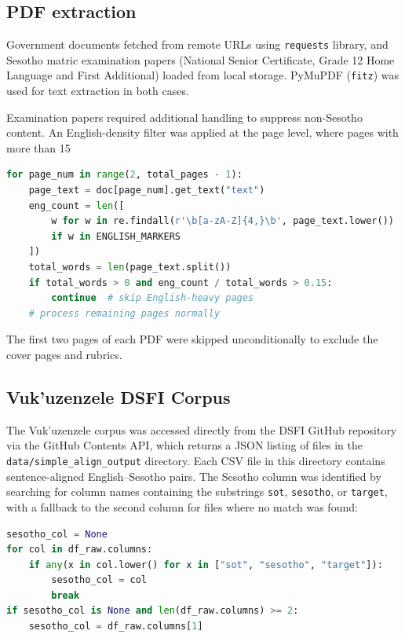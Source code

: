\documentclass[12pt]{ThesisRU}
\begin{document}
\subsection{PDF extraction}

Government documents fetched from remote URLs using \texttt{requests} library, and Sesotho matric examination papers (National Senior Certificate, Grade 12 Home Language and First Additional) loaded from local storage. PyMuPDF (\texttt{fitz}) was used for text extraction in both cases. 

Examination papers required additional handling to suppress non-Sesotho content. An English-density filter was applied at the page level, where pages with more than 15%

\begin{lstlisting}[language=Python, caption={English-density page filter for exam PDF extraction.}, label={lst:pdf}]
for page_num in range(2, total_pages - 1):
    page_text = doc[page_num].get_text("text")
    eng_count = len([
        w for w in re.findall(r'\b[a-zA-Z]{4,}\b', page_text.lower())
        if w in ENGLISH_MARKERS
    ])
    total_words = len(page_text.split())
    if total_words > 0 and eng_count / total_words > 0.15:
        continue  # skip English-heavy pages
    # process remaining pages normally
\end{lstlisting}

The first two pages of each PDF were skipped unconditionally to exclude the cover pages and rubrics.

\subsection{Vuk'uzenzele DSFI Corpus}

The Vuk'uzenzele corpus was accessed directly from the DSFI GitHub repository via the GitHub Contents API, which returns a JSON listing of files in the \texttt{data/simple\_align\_output} directory. Each CSV file in this directory contains sentence-aligned English--Sesotho pairs. The Sesotho column was identified by searching for column names containing the substrings \texttt{sot}, \texttt{sesotho}, or \texttt{target}, with a fallback to the second column for files where no match was found:

\begin{lstlisting}[language=Python, caption={Vuk'uzenzele Sesotho column extraction.}, label={lst:vuku}]
sesotho_col = None
for col in df_raw.columns:
    if any(x in col.lower() for x in ["sot", "sesotho", "target"]):
        sesotho_col = col
        break
if sesotho_col is None and len(df_raw.columns) >= 2:
    sesotho_col = df_raw.columns[1]
\end{lstlisting}
\end{document}
